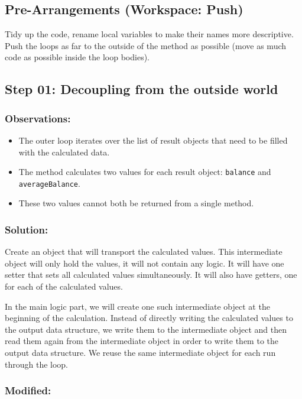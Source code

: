 \documentclass[a4paper,fleqn,titlepage,11pt]{article}
\begin{document}
\subsection*{Pre-Arrangements (Workspace: Push)}

Tidy up the code, rename local variables to make their names more descriptive.
Push the loops as far to the outside of the method as possible (move as much code as possible inside the loop bodies).

\subsection*{Step 01: Decoupling from the outside world}

\subsubsection*{Observations:}
\begin{itemize}
\item The outer loop iterates over the list of result objects that need to be filled with the calculated data.
\item The method calculates two values for each result object: \texttt{balance} and \texttt{averageBalance}. 
\item These two values cannot both be returned from a single method.
\end{itemize}

\subsubsection*{Solution:}

Create an object that will transport the calculated values. 
This intermediate object will only hold the values, it will not contain any logic. It will have one setter that sets all calculated values simultaneously. It will also have getters, one for each of the calculated values.

In the main logic part, we will create one such intermediate object at the beginning of the calculation. Instead of directly writing the calculated values to the output data structure, we write them to the intermediate object and then read them again from the intermediate object in order to write them to the output data structure. We reuse the same intermediate object for each run through the loop.

\subsubsection*{Modified:}
\end{document}

